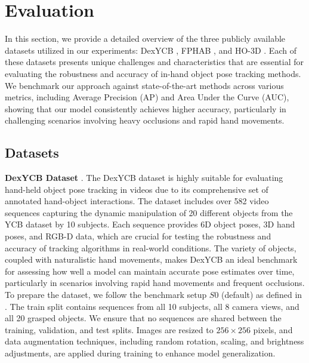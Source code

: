 \section{Evaluation}
\label{sec:Evaluation}

In this section, we provide a detailed overview of the three publicly available datasets utilized in our experiments: DexYCB \cite{chao2021dexycb}, FPHAB \cite{garcia2018first}, and HO-3D \cite{hampali2020honnotate}. Each of these datasets presents unique challenges and characteristics that are essential for evaluating the robustness and accuracy of in-hand object pose tracking methods. We benchmark our approach against state-of-the-art methods across various metrics, including Average Precision (AP) and Area Under the Curve (AUC), showing that our model consistently achieves higher accuracy, particularly in challenging scenarios involving heavy occlusions and rapid hand movements.

\subsection{Datasets}

\textbf{DexYCB Dataset} \cite{chao2021dexycb}. The DexYCB dataset is highly suitable for evaluating hand-held object pose tracking in videos due to its comprehensive set of annotated hand-object interactions. The dataset includes over 582 video sequences capturing the dynamic manipulation of 20 different objects from the YCB dataset by 10 subjects. Each sequence provides 6D object poses, 3D hand poses, and RGB-D data, which are crucial for testing the robustness and accuracy of tracking algorithms in real-world conditions. The variety of objects, coupled with naturalistic hand movements, makes DexYCB an ideal benchmark for assessing how well a model can maintain accurate pose estimates over time, particularly in scenarios involving rapid hand movements and frequent occlusions. To prepare the dataset, we follow the benchmark setup $S0$ (default) as defined in \cite{chao2021dexycb}. The train split contains sequences from all 10 subjects, all 8 camera views, and all 20 grasped objects. We ensure that no sequences are shared between the training, validation, and test splits. Images are resized to $256 \times 256$ pixels, and data augmentation techniques, including random rotation, scaling, and brightness adjustments, are applied during training to enhance model generalization. 

